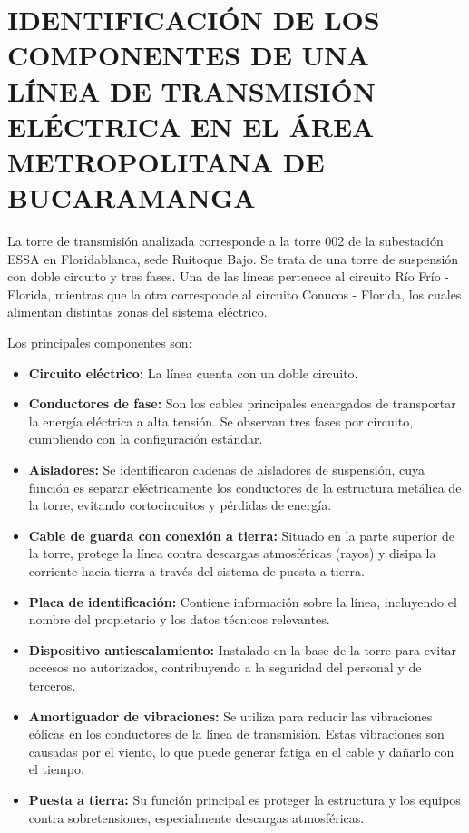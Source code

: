 \section{IDENTIFICACIÓN DE LOS COMPONENTES DE UNA LÍNEA DE TRANSMISIÓN ELÉCTRICA EN EL ÁREA METROPOLITANA DE BUCARAMANGA}

La torre de transmisión analizada corresponde a la torre 002 de la subestación ESSA en Floridablanca, sede Ruitoque Bajo. Se trata de una torre de suspensión con doble circuito y tres fases. Una de las líneas pertenece al circuito Río Frío - Florida, mientras que la otra corresponde al circuito Conucos - Florida, los cuales alimentan distintas zonas del sistema eléctrico.

Los principales componentes son:

\begin{itemize}
    \item \textbf{Circuito eléctrico:} La línea cuenta con un doble circuito.
    \item \textbf{Conductores de fase:} Son los cables principales encargados de transportar la energía eléctrica a alta tensión. Se observan tres fases por circuito, cumpliendo con la configuración estándar.
    \item \textbf{Aisladores:} Se identificaron cadenas de aisladores de suspensión, cuya función es separar eléctricamente los conductores de la estructura metálica de la torre, evitando cortocircuitos y pérdidas de energía.
    \item \textbf{Cable de guarda con conexión a tierra:} Situado en la parte superior de la torre, protege la línea contra descargas atmosféricas (rayos) y disipa la corriente hacia tierra a través del sistema de puesta a tierra.
    \item \textbf{Placa de identificación:} Contiene información sobre la línea, incluyendo el nombre del propietario y los datos técnicos relevantes.
    \item \textbf{Dispositivo antiescalamiento:} Instalado en la base de la torre para evitar accesos no autorizados, contribuyendo a la seguridad del personal y de terceros.
    \item \textbf{Amortiguador de vibraciones:} Se utiliza para reducir las vibraciones eólicas en los conductores de la línea de transmisión. Estas vibraciones son causadas por el viento, lo que puede generar fatiga en el cable y dañarlo con el tiempo.
    \item \textbf{Puesta a tierra:} Su función principal es proteger la estructura y los equipos contra sobretensiones, especialmente descargas atmosféricas.
\end{itemize}

